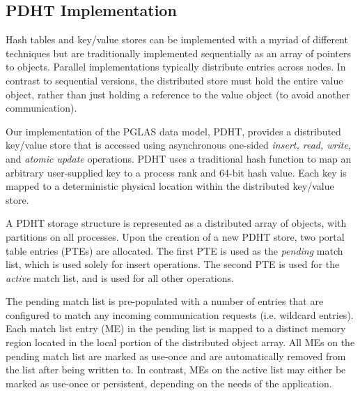\subsection{PDHT Implementation}

Hash tables and key/value stores can be implemented with a myriad of different
techniques but are traditionally implemented sequentially as an array of
pointers to objects.  Parallel implementations typically distribute entries
across nodes. In contrast to sequential versions, the distributed store must
hold the entire value object, rather than just holding a reference to the value
object (to avoid another communication).



Our implementation of the PGLAS data model, PDHT, provides a distributed
key/value store that is accessed using asynchronous one-sided {\em insert,
  read, write,} and {\em atomic update} operations. PDHT uses a traditional
hash function\cite{cityhash} to map an arbitrary user-supplied key to a process
rank and 64-bit hash value. Each key is mapped to a deterministic physical
location within the distributed key/value store.

A PDHT storage structure is represented as a distributed array of objects, with
partitions on all processes. Upon the creation of a new PDHT store, two portal
table entries (PTEs) are allocated. The first PTE is used as the {\em pending}
match list, which is used solely for insert operations.  The second PTE is used
for the {\em active} match list, and is used for all other operations. 

The pending match list is pre-populated with a number of entries that are
configured to match any incoming communication requests (i.e. wildcard
entries). Each match list entry (ME) in the pending list is mapped to a
distinct memory region located in the local portion of the distributed object
array. All MEs on the pending match list are marked as use-once and are
automatically removed from the list after being written to. In contrast, MEs on
the active list may either be marked as use-once or persistent, depending on
the needs of the application.

